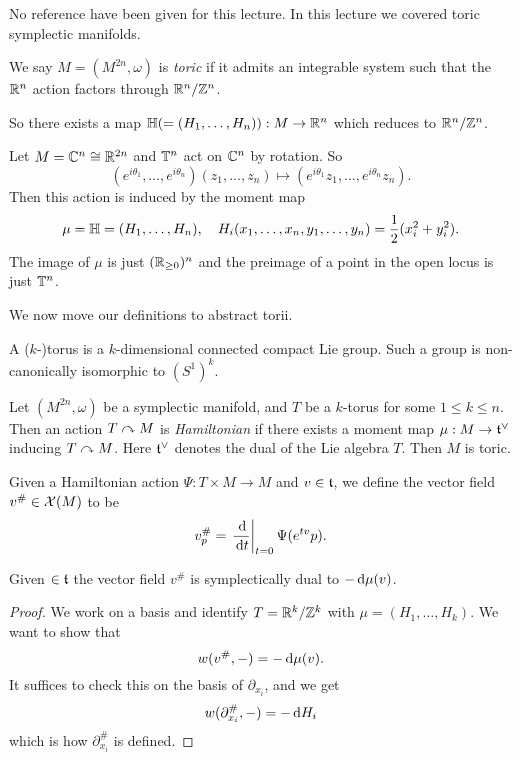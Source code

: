 No reference have been given for this lecture.
In this lecture we covered toric symplectic manifolds.

\begin{dfn}
    We say $M=(M^{2n},\omega)$ is \emph{toric} if it admits an integrable system such that the $\mathbb{R}^n$ action factors through $\mathbb{R}^n/\mathbb{Z}^n$.
\end{dfn}

So there exists a map $\mathbb{H}(=(H_1,\ldots,H_n)):M\to\mathbb{R}^n$ which reduces to $\mathbb{R}^n/\mathbb{Z}^n$.

\begin{example}
    Let $M=\mathbb{C}^n\cong\mathbb{R}^{2n}$ and $\mathbb{T}^n$ act on $\mathbb{C}^n$ by rotation.
    So
    \[(e^{i\theta_1},\ldots,e^{i\theta_n})(z_1,\ldots,z_n)\mapsto(e^{i\theta_1}z_1,\ldots,e^{i\theta_n}z_n).\]
    Then this action is induced by the moment map
    \[\mu=\mathbb{H}=(H_1,\ldots,H_n),\quad H_i(x_1,\ldots,x_n,y_1,\ldots,y_n)=\frac12(x_i^2+y_i^2).\]
    The image of $\mu$ is just $(\mathbb{R}_{\ge0})^n$ and the preimage of a point in the open locus is just $\mathbb{T}^n$.
\end{example}

We now move our definitions to abstract torii.

\begin{dfn}
    A ($k$-)torus is a $k$-dimensional connected compact Lie group.
    Such a group is non-canonically isomorphic to $(S^1)^k$.

    Let $(M^{2n},\omega)$ be a symplectic manifold, and $T$ be a $k$-torus for some $1\le k\le n$.
    Then an action $T\curvearrowright M$ is \emph{Hamiltonian} if there exists a moment map $\mu:M\to\mathfrak{t}^\vee$ inducing $T\curvearrowright M$.
    Here $\mathfrak{t}^\vee$ denotes the dual of the Lie algebra $T$.
    Then $M$ is toric.
    
    Given a Hamiltonian action $\Psi:T\times M\to M$ and $v\in\mathfrak{t}$, we define the vector field $v^\#\in\mathcal{X}(M)$ to be
    \[v_p^\#=\left.\frac{\,\mathrm d}{\,\mathrm d t}\right|_{t=0}\Psi(e^{tv}p).\]
\end{dfn}


\begin{lem}
    Given $\in\mathfrak{t}$ the vector field $v^\#$ is symplectically dual to $-\,\mathrm d\mu(v)$.
\end{lem}
\begin{proof}
    We work on  a basis and identify $T=\mathbb{R}^k/\mathbb{Z}^k$ with $\mu=(H_1,\ldots,H_k)$.
    We want to show that
    \[w(v^\#,-)=-\,\mathrm d\mu(v).\]
    It suffices to check this on the basis of $\partial_{x_i}$, and we get
    \[w(\partial_{x_i}^\#,-)=-\,\mathrm d H_i\]
    which is how $\partial_{x_i}^\#$ is defined.
\end{proof}

